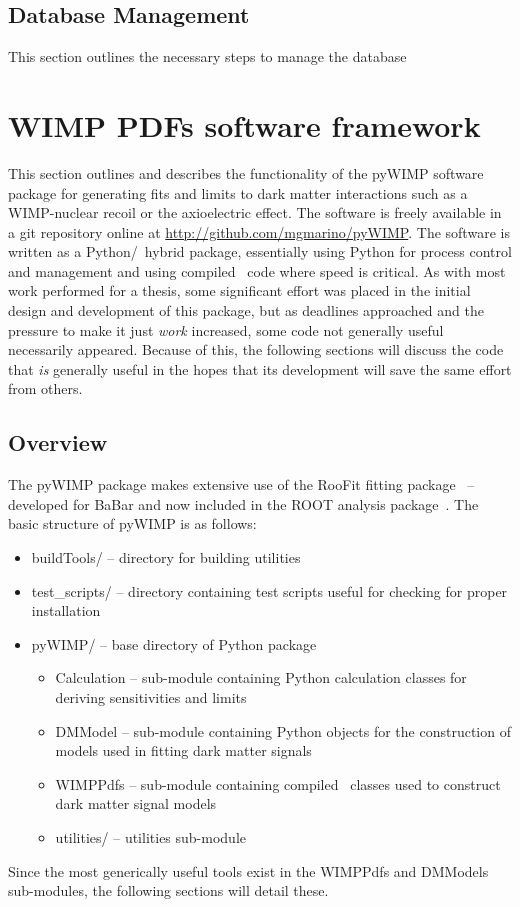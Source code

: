 		\subsection{Database Management}
	This section outlines the necessary steps to manage the database 


		
	\section{WIMP PDFs software framework}
	\label{sec:WIMPPDFs}
	This section outlines and describes the functionality of the pyWIMP software package for generating fits and limits
to dark matter interactions such as a WIMP-nuclear recoil or the axioelectric effect.  The software is freely available in a 
git repository online at \url{http://github.com/mgmarino/pyWIMP}.  The software is written as a Python/\cpp~hybrid package, essentially
using Python for process control and management and using compiled \cpp~code where speed is critical.  As with most work performed for a thesis, some significant effort was placed in the initial design and development of this package, but as deadlines approached and the pressure to make it just \emph{work} increased, some code not generally useful necessarily appeared.  Because of this, the following sections will discuss the code that \emph{is} generally useful in the hopes that its development will save the same effort from others.  
	
		\subsection{Overview}
	The pyWIMP package makes extensive use of the RooFit fitting package~\cite{ver03aa} -- developed for BaBar and now included in the ROOT analysis package~\cite{Bru97}.  The basic structure of pyWIMP is as follows:
	
			\begin{itemize}
				\item[] buildTools/ -- directory for building utilities
				\item[] test\_scripts/ -- directory containing test scripts useful for checking for proper installation
				\item[] pyWIMP/ -- base directory of Python package
				\begin{itemize}
					\item[] Calculation -- sub-module containing Python calculation classes for deriving sensitivities and limits
					\item[] DMModel -- sub-module containing Python objects for the construction of models used in fitting dark matter signals
					\item[] WIMPPdfs -- sub-module containing compiled \cpp~classes used to construct dark matter signal models
					\item[] utilities/ -- utilities sub-module
				\end{itemize}
			\end{itemize}
Since the most generically useful tools exist in the WIMPPdfs and DMModels sub-modules, the following sections will detail these.
			\lstset{
			   language=Python}		

